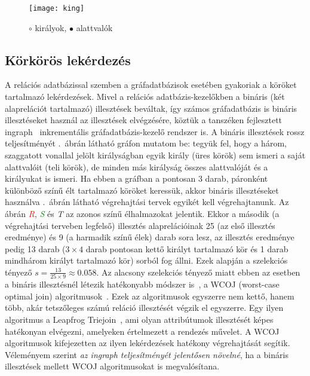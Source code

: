\begin{figure}[ht]
	\centering
	\texttt{[image: king]}
	\caption{{$\circ$} királyok, {$\bullet$} alattvalók~\cite{DBLP:journals/sigmod/NgoRR13}}
	\label{fig:king}
\end{figure}

\subsection{Körkörös lekérdezés}

A relációs adatbázissal szemben a gráfadatbázisok esetében gyakoriak a köröket tartalmazó lekérdezések. Mivel a relációs adatbázis-kezelőkben a bináris (két alaprelációt tartalmazó) illesztések beváltak, így számos gráfadatbázis is bináris illesztéseket használ az illesztések elvégzésére, köztük a tanszéken fejlesztett ingraph~\cite{DBLP:conf/sdl/MartonSB17} inkrementális gráfadatbázis-kezelő rendszer is. A bináris illesztések rossz teljesítményét .~ábrán látható gráfon mutatom be:
tegyük fel, hogy a három, szaggatott vonallal jelölt királyságban egyik király (üres körök) sem ismeri a saját alattvalóit (teli körök), de minden más királyság összes alattvalóját és a királyukat is ismeri. Ha ebben a gráfban a pontosan 3 darab, páronként különböző színű élt tartalmazó köröket keressük, akkor bináris illesztéseket használva .~ábrán látható végrehajtási tervek egyikét kell végrehajtanunk. Az ábrán \textcolor{red}{\textit{R}}, \textcolor{green}{\textit{S}} és
\textcolor{fullblue}{\textit{T}} az azonos színű élhalmazokat jelentik. Ekkor a második (a végrehajtási terveben legfelső) illesztés alaprelációinak 25 (az első illesztés eredménye) és 9 (a harmadik színű élek) darab sora lesz, az illesztés eredménye pedig 13 darab ($3 \times 4$ darab pontosan kettő királyt tartalmazó kör és 1 darab mindhárom királyt tartalmazó kör) sorból fog állni. Ezek alapján a szelekciós tényező $s = \frac{13}{25 \times 9} \approx 0.058$. Az alacsony szelekciós tényező miatt
ebben az esetben a bináris illesztésnél létezik hatékonyabb módszer is~\cite{DBLP:journals/sigmod/NgoRR13}, a WCOJ (worst-case optimal join) algoritmusok~\cite{DBLP:journals/jacm/NgoPRR18}. Ezek az algoritmusok egyszerre nem kettő, hanem több, akár tetszőleges számú reláció illesztését végzik el egyszerre. Egy ilyen algoritmus a Leapfrog Triejoin~\cite{DBLP:conf/icdt/Veldhuizen14}, ami olyan attribútumok illesztését képes hatékonyan elvégezni, amelyeken értelmezett a rendezés művelet.
A WCOJ algoritmusok kifejezetten az ilyen lekérdezések hatékony végrehajtását segítik. Véleményem szerint \emph{az ingraph teljesítményét jelentősen növelné}, ha a bináris illesztések mellett WCOJ algoritmusokat is megvalósítana.

